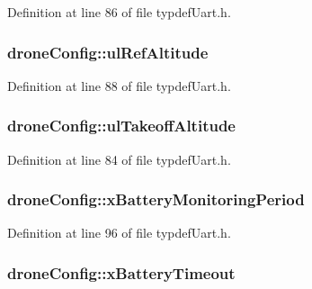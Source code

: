 Definition at line 86 of file typdef\-Uart.\-h.

\hypertarget{structdroneConfig_a7d7f05ea8f93c206ce1a8a2fa868c587}{
\subsubsection[{ul\-Ref\-Altitude}]{ drone\-Config\-::ul\-Ref\-Altitude}}\label{structdroneConfig_a7d7f05ea8f93c206ce1a8a2fa868c587}


Definition at line 88 of file typdef\-Uart.\-h.

\hypertarget{structdroneConfig_a732c5a9d1af9eec7412c8a282109728a}{
\subsubsection[{ul\-Takeoff\-Altitude}]{ drone\-Config\-::ul\-Takeoff\-Altitude}}\label{structdroneConfig_a732c5a9d1af9eec7412c8a282109728a}


Definition at line 84 of file typdef\-Uart.\-h.

\hypertarget{structdroneConfig_afa883d29d2c43da22c11352af00ffb7b}{
\subsubsection[{x\-Battery\-Monitoring\-Period}]{ drone\-Config\-::x\-Battery\-Monitoring\-Period}}\label{structdroneConfig_afa883d29d2c43da22c11352af00ffb7b}


Definition at line 96 of file typdef\-Uart.\-h.

\hypertarget{structdroneConfig_a30a59cf24e01d514b6d72c86deb1f02e}{
\subsubsection[{x\-Battery\-Timeout}]{ drone\-Config\-::x\-Battery\-Timeout}}\label{structdroneConfig_a30a59cf24e01d514b6d72c86deb1f02e}


